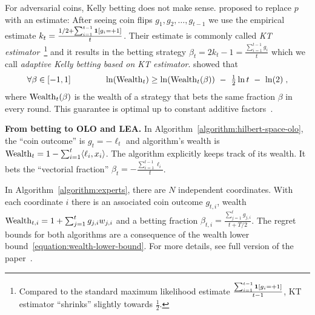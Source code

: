For adversarial coins, Kelly betting does not make sense.
\citet{Krichevsky-Trofimov-1981} proposed to replace $p$ with an estimate:
After seeing coin flips
$g_1, g_2, \dots, g_{t-1}$ we use the empirical estimate $k_t = \frac{1/2 +
\sum_{i=1}^{t-1} \mathbf{1}[g_i = +1]}{t}$. Their
estimate is commonly called \emph{KT estimator}~\footnote{Compared to the
standard maximum likelihood estimate $\frac{\sum_{i=1}^{t-1} \mathbf{1}[g_i =
+1]}{t-1}$, KT estimator ``shrinks'' slightly towards $\frac{1}{2}$.}
and it results in the betting strategy
$
\beta_t = 2k_t - 1 = \tfrac{\sum_{i=1}^{t-1} g_i}{t}
$
which we call \emph{adaptive Kelly betting based on KT estimator}.
\citeauthor{Krichevsky-Trofimov-1981} showed that
\begin{equation}
\label{equation:wealth-lower-bound}
\forall \beta \in [-1,1] \qquad \qquad \ln(\operatorname{Wealth}_t) \ge \ln(\operatorname{Wealth}_t(\beta)) \ - \ \tfrac{1}{2} \ln t \ - \ \ln(2) \; ,
\end{equation}
where $\operatorname{Wealth}_t(\beta)$ is the wealth of a strategy that bets the same
fraction $\beta$ in every round. This guarantee is optimal up to constant
additive factors~\citep{Cesa-Bianchi-Lugosi-2006}.

\textbf{From betting to \ac{OLO} and \ac{LEA}.}
In Algorithm~\ref{algorithm:hilbert-space-olo}, the ``coin outcome'' is
$g_t = -\ell_t$ and algorithm's wealth is
$
\operatorname{Wealth}_t = 1 - \sum_{i=1}^t \langle \ell_i, x_i \rangle
$.
The algorithm explicitly keeps track of its wealth. It bets the ``vectorial fraction''
$
\beta_t = - \tfrac{\sum_{i=1}^{t-1} \ell_i}{t}
$.

In Algorithm~\ref{algorithm:experts}, there are $N$ independent coordinates.
With each coordinate $i$ there is an associated coin outcome $g_{t,i}$, wealth
$
\operatorname{Wealth}_{t,i} = 1 + \sum_{j=1}^t g_{j,i} w_{j,i}
$
and a betting fraction
$
\beta_{t,i} = \tfrac{\sum_{j=1}^t g_{j,i}}{t + T/2}
$.
The regret bounds for both algorithms are a consequence of the wealth lower
bound~\eqref{equation:wealth-lower-bound}.  For more details, see full version
of the paper~\citep{Orabona-Pal-2016-parameter-free}.
